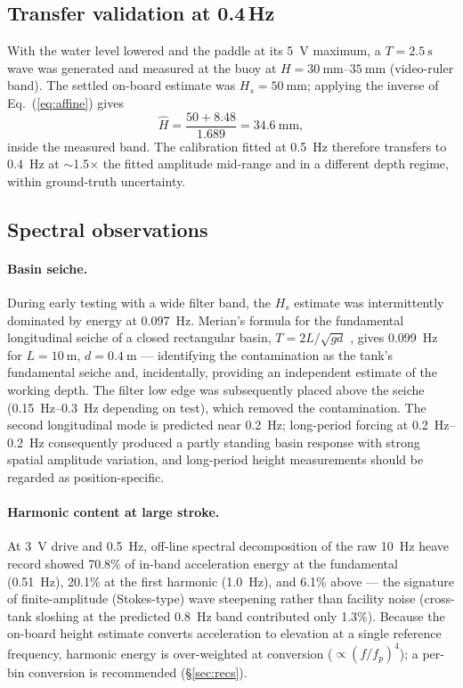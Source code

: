 \documentclass[11pt,a4paper]{article}
\begin{document}
\subsection{Transfer validation at 0.4\,Hz}
\label{sec:transfer}
With the water level lowered and the paddle at its \SI{5}{\volt} maximum, a
$T = \SI{2.5}{\second}$ wave was generated and measured at the buoy at
$H = \SIrange{30}{35}{\milli\meter}$ (video-ruler band). The settled on-board
estimate was $H_s = \SI{50}{\milli\meter}$; applying the inverse of
Eq.~(\ref{eq:affine}) gives
\[
  \hat H = \frac{50 + 8.48}{1.689} = \SI{34.6}{\milli\meter},
\]
inside the measured band. The calibration fitted at \SI{0.5}{\hertz} therefore
transfers to \SI{0.4}{\hertz} at $\sim$1.5$\times$ the fitted amplitude
mid-range and in a different depth regime, within ground-truth uncertainty.

\subsection{Spectral observations}
\label{sec:seiche}

\paragraph{Basin seiche.} During early testing with a wide filter band, the
$H_s$ estimate was intermittently dominated by energy at \SI{0.097}{\hertz}.
Merian's formula for the fundamental longitudinal seiche of a closed
rectangular basin, $T = 2L/\sqrt{gd}$ \citep{rabinovich2009}, gives
\SI{0.099}{\hertz} for $L = \SI{10}{\meter}$, $d = \SI{0.4}{\meter}$ ---
identifying the contamination as the tank's fundamental seiche and,
incidentally, providing an independent estimate of the working depth. The
filter low edge was subsequently placed above the seiche
(\SIrange{0.15}{0.3}{\hertz} depending on test), which removed the
contamination. The second longitudinal mode is predicted near
\SI{0.2}{\hertz}; long-period forcing at \SIrange{0.2}{0.2}{\hertz}
consequently produced a partly standing basin response with strong spatial
amplitude variation, and long-period height measurements should be regarded
as position-specific.

\paragraph{Harmonic content at large stroke.} At \SI{3}{\volt} drive and
\SI{0.5}{\hertz}, off-line spectral decomposition of the raw
\SI{10}{\hertz} heave record showed 70.8\% of in-band acceleration energy at
the fundamental (\SI{0.51}{\hertz}), 20.1\% at the first harmonic
(\SI{1.0}{\hertz}), and 6.1\% above --- the signature of finite-amplitude
(Stokes-type) wave steepening rather than facility noise (cross-tank sloshing
at the predicted \SI{0.8}{\hertz} band contributed only 1.3\%). Because the
on-board height estimate converts acceleration to elevation at a single
reference frequency, harmonic energy is over-weighted at conversion
($\propto (f/f_p)^4$); a per-bin conversion is recommended
(\S\ref{sec:recs}).
\end{document}
